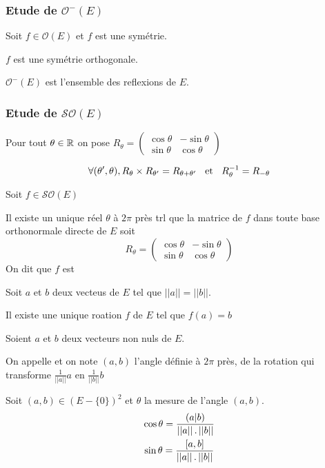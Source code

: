 \subsubsection{Etude de $\mathcal{O}^-(E)$}

\begin{prp}
Soit $f \in \mathcal{O}(E)$ et $f$ est une symétrie.

$f$ est une symétrie orthogonale.
\end{prp}

\begin{prp}
$\mathcal{O}^-(E)$ est l'ensemble des reflexions de $E$.
\end{prp}

\subsubsection{Etude de $\mathcal{SO}(E)$}

\begin{prp}
Pour tout $\theta \in \mathbb{R}$ on pose
\(
    R_\theta = \begin{pmatrix}
        \cos \theta & -\sin \theta \\
        \sin \theta & \cos \theta
    \end{pmatrix}
\)

\[
    \forall (\theta', \theta), R_\theta \times R_{\theta'} =
    R_{\theta + \theta'} \;\;\text{ et }\;\; R_\theta^{-1} = R_{-\theta}
\]
\end{prp}

\begin{prp}
Soit $f \in \mathcal{SO}(E)$

Il existe un unique réel $\theta$ à $2\pi$ près trl que la matrice
de $f$ dans toute base orthonormale directe de $E$ soit
\[
    R_\theta = \begin{pmatrix}
        \cos \theta & -\sin \theta \\
        \sin \theta & \cos \theta
    \end{pmatrix}
\]
On dit que $f$ est 
\end{prp}

\begin{prp}
Soit $a$ et $b$ deux vecteus de $E$ tel que $||a|| = ||b||$.

Il existe une unique roation $f$ de $E$ tel que $f(a) = b$
\end{prp}

\begin{dfn}
Soient $a$ et $b$ deux vecteurs non nuls de $E$.

On appelle  et on note
$(a, b)$ l'angle définie à $2\pi$ près, de la rotation qui transforme
$\frac{1}{||a||} a$ en $\frac{1}{||b||} b$
\end{dfn}

\begin{prp}
Soit $(a, b) \in (E-\{0\})^2$ et $\theta$ la mesure de l'angle $(a, b)$.
\begin{gather*}
\cos \theta = \frac{(a|b)}{||a|| \operatorname{.} ||b||} \\
\sin \theta = \frac{[a, b]}{||a|| \operatorname{.} ||b||}
\end{gather*}
\end{prp}


